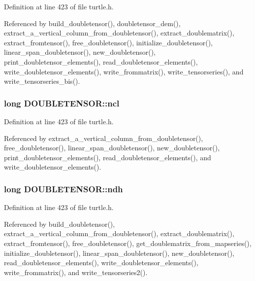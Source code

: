 Definition at line 423 of file turtle.\-h.



Referenced by build\-\_\-doubletensor(), doubletensor\-\_\-dem(), extract\-\_\-a\-\_\-vertical\-\_\-column\-\_\-from\-\_\-doubletensor(), extract\-\_\-doublematrix(), extract\-\_\-fromtensor(), free\-\_\-doubletensor(), initialize\-\_\-doubletensor(), linear\-\_\-span\-\_\-doubletensor(), new\-\_\-doubletensor(), print\-\_\-doubletensor\-\_\-elements(), read\-\_\-doubletensor\-\_\-elements(), write\-\_\-doubletensor\-\_\-elements(), write\-\_\-frommatrix(), write\-\_\-tensorseries(), and write\-\_\-tensorseries\-\_\-bis().

\hypertarget{struct_d_o_u_b_l_e_t_e_n_s_o_r_a4eeb67eb095aa0f1fbe1f3942a3cb9d9}{
\subsubsection[{ncl}]{\setlength{\rightskip}{0pt plus 5cm}long D\-O\-U\-B\-L\-E\-T\-E\-N\-S\-O\-R\-::ncl}}\label{struct_d_o_u_b_l_e_t_e_n_s_o_r_a4eeb67eb095aa0f1fbe1f3942a3cb9d9}


Definition at line 423 of file turtle.\-h.



Referenced by extract\-\_\-a\-\_\-vertical\-\_\-column\-\_\-from\-\_\-doubletensor(), free\-\_\-doubletensor(), linear\-\_\-span\-\_\-doubletensor(), new\-\_\-doubletensor(), print\-\_\-doubletensor\-\_\-elements(), read\-\_\-doubletensor\-\_\-elements(), and write\-\_\-doubletensor\-\_\-elements().

\hypertarget{struct_d_o_u_b_l_e_t_e_n_s_o_r_a5c2827aa2583196e3b29f49f38af74d9}{
\subsubsection[{ndh}]{\setlength{\rightskip}{0pt plus 5cm}long D\-O\-U\-B\-L\-E\-T\-E\-N\-S\-O\-R\-::ndh}}\label{struct_d_o_u_b_l_e_t_e_n_s_o_r_a5c2827aa2583196e3b29f49f38af74d9}


Definition at line 423 of file turtle.\-h.



Referenced by build\-\_\-doubletensor(), extract\-\_\-a\-\_\-vertical\-\_\-column\-\_\-from\-\_\-doubletensor(), extract\-\_\-doublematrix(), extract\-\_\-fromtensor(), free\-\_\-doubletensor(), get\-\_\-doublematrix\-\_\-from\-\_\-mapseries(), initialize\-\_\-doubletensor(), linear\-\_\-span\-\_\-doubletensor(), new\-\_\-doubletensor(), read\-\_\-doubletensor\-\_\-elements(), write\-\_\-doubletensor\-\_\-elements(), write\-\_\-frommatrix(), and write\-\_\-tensorseries2().

